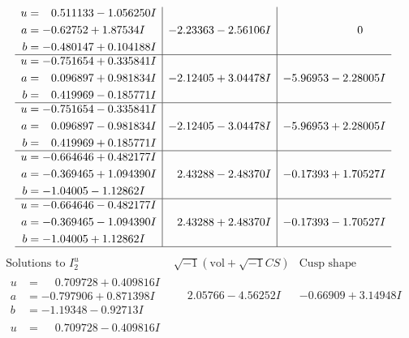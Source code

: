 \documentclass[1p]{elsarticle_modified}
\theoremstyle{definition}
\newcommand{\I}{\sqrt{-1}}
\begin{document}
$$\begin{array}{c|c|c}
\begin{aligned}
u &= \phantom{-}0.511133 - 1.056250 I \\
a &= -0.62752 + 1.87534 I \\
b &= -0.480147 + 0.104188 I\end{aligned}
 & -2.23363 - 2.56106 I & \phantom{-0.000000 } 0 \\ \hline\begin{aligned}
u &= -0.751654 + 0.335841 I \\
a &= \phantom{-}0.096897 + 0.981834 I \\
b &= \phantom{-}0.419969 - 0.185771 I\end{aligned}
 & -2.12405 + 3.04478 I & -5.96953 - 2.28005 I \\ \hline\begin{aligned}
u &= -0.751654 - 0.335841 I \\
a &= \phantom{-}0.096897 - 0.981834 I \\
b &= \phantom{-}0.419969 + 0.185771 I\end{aligned}
 & -2.12405 - 3.04478 I & -5.96953 + 2.28005 I \\ \hline\begin{aligned}
u &= -0.664646 + 0.482177 I \\
a &= -0.369465 + 1.094390 I \\
b &= -1.04005 - 1.12862 I\end{aligned}
 & \phantom{-}2.43288 - 2.48370 I & -0.17393 + 1.70527 I \\ \hline\begin{aligned}
u &= -0.664646 - 0.482177 I \\
a &= -0.369465 - 1.094390 I \\
b &= -1.04005 + 1.12862 I\end{aligned}
 & \phantom{-}2.43288 + 2.48370 I & -0.17393 - 1.70527 I\\
 \hline 
 \end{array}$$\newpage$$\begin{array}{c|c|c}  
\text{Solutions to }I^u_{2}& \I (\text{vol} + \sqrt{-1}CS) & \text{Cusp shape}\\
 \hline 
\begin{aligned}
u &= \phantom{-}0.709728 + 0.409816 I \\
a &= -0.797906 + 0.871398 I \\
b &= -1.19348 - 0.92713 I\end{aligned}
 & \phantom{-}2.05766 - 4.56252 I & -0.66909 + 3.14948 I \\ \hline\begin{aligned}
u &= \phantom{-}0.709728 - 0.409816 I \\

\end{aligned}
\end{array}$$
\end{document}
